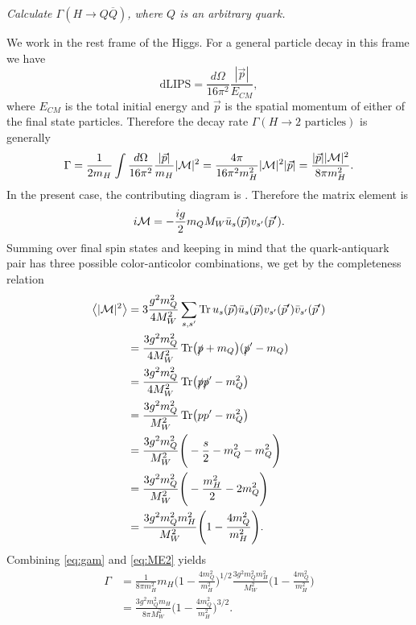 {\it Calculate $\Gamma(H\to Q\overline{Q})$, where $Q$ is an arbitrary quark.}
\vspace{5mm}

We work in the rest frame of the Higgs. For a general particle decay in this
frame we have \cite[p.107]{peskin_introduction_1995}
\begin{equation}
  \text{dLIPS}=\frac{d\Omega}{16\pi^2}\frac{|\vec{p}|}{E_{CM}},
\end{equation}
where $E_{CM}$ is the total initial energy and $\vec{p}$ is the spatial
momentum of either of the final state particles. Therefore the decay rate
$\Gamma(H\to\text{2 particles})$ is generally
\begin{equation}
  \label{eq:gam}
  \Gamma=\frac{1}{2m_H}\int\frac{d\Omega}{16\pi^2}
             \frac{|\vec{p}|}{m_H}|\mathcal{M}|^2
        =\frac{4\pi}{16\pi^2 m_H^2}|\mathcal{M}|^2|\vec{p}|
        =\frac{|\vec{p}||\mathcal{M}|^2}{8\pi m_H^2}.
\end{equation}
In the present case, the contributing diagram is . Therefore the matrix
element is
\begin{equation}
  i\mathcal{M}=-\frac{ig}{2}{m_Q}{M_W}\bar{u}_s(\vec{p})v_{s'}(\vec{p}').
\end{equation}
Summing over final spin states and keeping in mind that the quark-antiquark
pair has three possible color-anticolor combinations, we get by the
completeness relation
\begin{equation}
  \label{eq:ME2}
  \begin{aligned}
    \left< |\mathcal{M}|^2 \right>&=3\frac{g^2 m_Q^2}{4M_W^2}\sum\limits_{s,s'}
      \Tr u_s(\vec{p})\bar{u}_s(\vec{p})
          v_{s'}(\vec{p}')\bar{v}_{s'}(\vec{p}') \\
    &=\frac{3g^2 m_Q^2}{4M_W^2}\Tr(\slashed{p}+m_Q)(\slashed{p}'-m_Q) \\
    &=\frac{3g^2 m_Q^2}{4M_W^2}\Tr(\slashed{p}\slashed{p}'-m_Q^2) \\
    &=\frac{3g^2 m_Q^2}{M_W^2}\Tr(pp'-m_Q^2) \\
    &=\frac{3g^2 m_Q^2}{M_W^2}\Bigg(-\frac{s}{2}-m_Q^2-m_Q^2\Bigg) \\
    &=\frac{3g^2 m_Q^2}{M_W^2}\Bigg(-\frac{m_H^2}{2}-2m_Q^2\Bigg) \\
    &=\frac{3g^2 m_Q^2 m_H^2}{M_W^2}\Bigg(1-\frac{4m_Q^2}{m_H^2}\Bigg).
  \end{aligned}
\end{equation}
Combining \eqref{eq:gam} and \eqref{eq:ME2} yields
\begin{equation}
  \label{eq:gamQ}
  \begin{aligned}
    \Gamma&=\frac{1}{8\pi m_H^2}{m_H}\Bigg(1-\frac{4m_Q^2}{m_H^2}\Bigg)^{1/2}
            \frac{3g^2m_Q^2m_H^2}{M_W^2}\Bigg(1-\frac{4m_Q^2}{m_H^2}\Bigg)\\
          &=\frac{3g^2m_Q^2m_H}{8\pi M_W^2}
               \Bigg(1-\frac{4m_Q^2}{m_H^2}\Bigg)^{3/2}.
  \end{aligned}
\end{equation}

